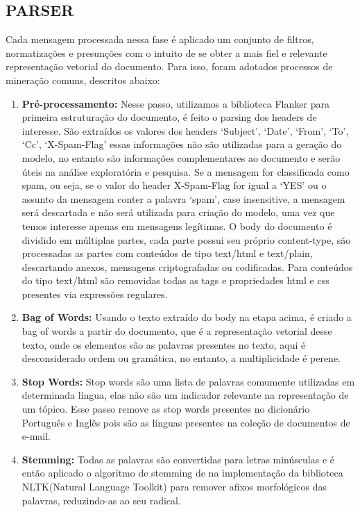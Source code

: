 \documentclass[12pt,a4paper]{article}
\begin{document}
  
  \subsection{PARSER}
  Cada mensagem processada nessa fase é aplicado um conjunto de filtros, normatizações e presunções com o intuito de se obter a mais fiel e relevante representação vetorial do documento. Para isso, foram adotados processos de mineração comuns, descritos abaixo:
  
  \begin{enumerate}
  \item \textbf{Pré-processamento:} Nesse passo, utilizamos a biblioteca Flanker para primeira estruturação do documento, é feito o parsing dos headers de interesse. São extraídos os valores dos headers ‘Subject’, ‘Date’, ‘From’, ‘To’, ‘Cc’, ‘X-Spam-Flag’ essas informações não são utilizadas para a geração do modelo, no entanto são informações complementares ao documento e serão úteis na análise exploratória e pesquisa. Se a mensagem for classificada como spam, ou seja, se o valor do header X-Spam-Flag for igual a ‘YES’ ou o assunto da mensagem conter a palavra ‘spam’, case insensitive, a mensagem será descartada e não será utilizada para criação do modelo, uma vez que temos interesse apenas em mensagens legítimas. O body do documento é dividido em múltiplas partes, cada parte possui seu próprio content-type, são processadas as partes com conteúdos de tipo text/html e text/plain, descartando anexos, mensagens criptografadas ou codificadas. Para conteúdos do tipo text/html são removidas todas as tags e propriedades html e css presentes via expressões regulares.
  \item \textbf{Bag of Words:} Usando o texto extraído do body na etapa acima, é criado a bag of words a partir do documento, que é a representação vetorial desse texto, onde os elementos são as palavras presentes no texto, aqui é desconsiderado ordem ou gramática, no entanto, a multiplicidade é perene.
  \item \textbf{Stop Words:} Stop words são uma lista de palavras comumente utilizadas em determinada língua, elas não são um indicador relevante na representação de um tópico. Esse passo remove as stop words presentes no dicionário Português e Inglês pois são as línguas presentes na coleção de documentos de e-mail.
  \item \textbf{Stemming:} Todas as palavras são convertidas para letras minúsculas e é então aplicado o algoritmo de stemming de  na implementação da biblioteca NLTK(Natural Language Toolkit)  para remover afixos morfológicos das palavras, reduzindo-as ao seu radical.
  

\end{enumerate}
\end{document}
